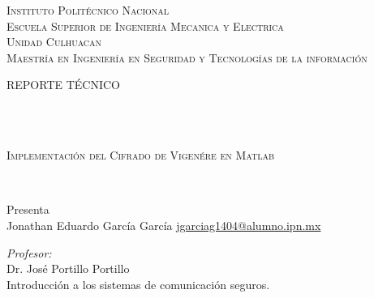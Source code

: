 \begin{center}
    \textsc{\huge Instituto Polit\'ecnico Nacional}\\[1cm] 
    \textsc{\LARGE Escuela Superior de Ingenier\'ia Mecanica y Electrica}\\[0.5cm] %
    \textsc{\LARGE Unidad Culhuacan}\\[0.5cm] %
    \textsc{\LARGE Maestría en Ingeniería en Seguridad y Tecnologías de la información }\\[1cm] %
    
    \begin{minipage}{0.9\textwidth} 
    \begin{center}																					%
    \textsc{\LARGE REPORTE TÉCNICO}
    \end{center}
    \end{minipage}\\[0.5cm]
                 \vspace*{1cm}															%
    \HRule \\[0.1cm]																	%
    \begin{center} \textsc{\Large Implementación del Cifrado de Vigenére en Matlab\\}
    \end{center}
    \HRule \\[0.1cm]%
    
    
    
    
       \vspace{0.8cm}
    \begin{center}
    {\large Presenta}\\                                                                %
    Jonathan Eduardo García García\hspace{1cm} \href{mailto:jgarciag1404@alumno.ipn.mx}{jgarciag1404@alumno.ipn.mx}
    \vspace{1 cm}
    \end{center}
    
    \begin{center}
    \begin{minipage}{1\textwidth}													    %
    \begin{flushleft} \large														    %
    \emph{Profesor:}\\
    \vspace{0.3cm}
    Dr. José Portillo Portillo\\
        Introducción a los sistemas de comunicación seguros.
        \vspace*{1cm}	
    \end{flushleft}	
    \end{minipage}		                                            %
    \end{center}
    

\end{center}
